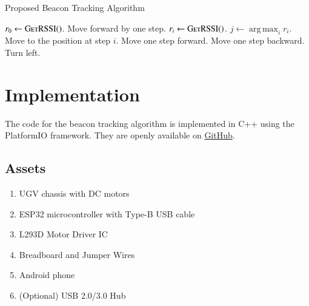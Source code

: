 \documentclass[conference]{IEEEtran}
\DeclareMathOperator*{\argmax}{arg\,max}
\begin{document}
\begin{algorithm}[H]
    \caption{Proposed Beacon Tracking Algorithm}
    \label{alg:beacon}
    \begin{algorithmic}[1]
            \State \(r_0 \gets \textsc{GetRSSI()}\).
                \State Move forward by one step.
                \State \(r_i \gets \textsc{GetRSSI()}\).
            \EndFor
            \State \(j \gets \argmax_{i} r_i\).
            \State Move to the position at step \(i\).
                \State Move one step forward.
                \State Move one step backward.
            \Else
                \State Turn left.
            \EndIf
        \EndWhile
    \end{algorithmic}
\end{algorithm}

\section{Implementation}
\label{sec:implementation}

The code for the beacon tracking algorithm is implemented in C++ using the
PlatformIO framework. They are openly available on
\href{https://github.com/goats-9/ee2802/main/ugv-beacon/codes}{GitHub}.

\subsection{Assets}
\begin{enumerate}
    \item UGV chassis with DC motors
    \item ESP32 microcontroller with Type-B USB cable
    \item L293D Motor Driver IC
    \item Breadboard and Jumper Wires
    \item Android phone
    \item (Optional) USB 2.0/3.0 Hub
\end{enumerate}
\end{document}

